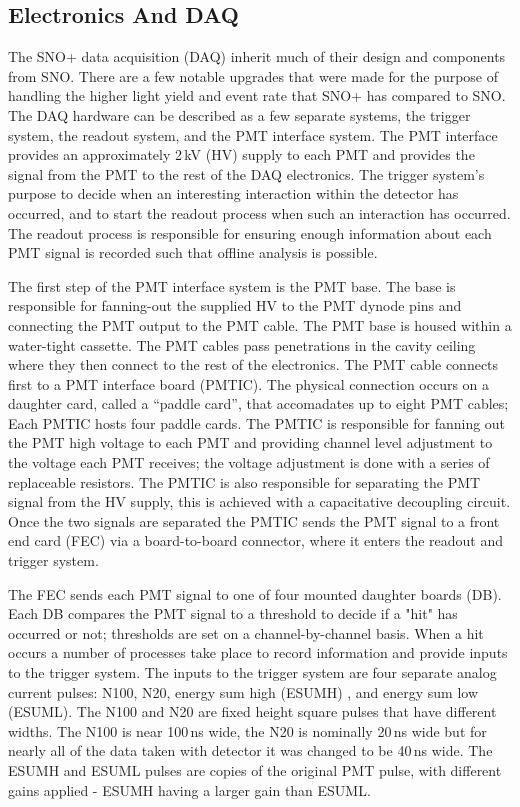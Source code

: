 \subsection{Electronics And DAQ}
The SNO+ data acquisition (DAQ) inherit much of their design and components from
SNO.
There are a few notable upgrades that were made for the purpose of handling the
higher light yield and event rate that SNO+ has compared to SNO.
The DAQ hardware can be described as a few separate systems, the trigger system,
the readout system, and the PMT interface system.
The PMT interface provides an approximately 2\,kV (HV) supply to each PMT and provides
the signal from the PMT to the rest of the DAQ electronics.
The trigger system's purpose to decide when an interesting interaction
within the detector has occurred, and to start the readout process when such an
interaction has occurred.
The readout process is responsible for ensuring enough information about each
PMT signal is recorded such that offline analysis is possible.

The first step of the PMT interface system is the PMT base. The base is responsible
for fanning-out the supplied HV to the PMT dynode pins and connecting the PMT output
to the PMT cable. The PMT base is housed within a water-tight cassette.
The PMT cables pass penetrations in the cavity ceiling where they then connect
to the rest of the electronics. The PMT cable connects first to a PMT interface
board (PMTIC). The physical connection occurs on a daughter card, called a ``paddle card'',
that accomadates up to eight PMT cables; Each PMTIC hosts four paddle cards.
The PMTIC is responsible for fanning out the PMT high voltage
to each PMT and providing channel level adjustment to the voltage
each PMT receives; the voltage adjustment is done with a series of
replaceable resistors.
The PMTIC is also responsible for separating the PMT signal from the HV
supply, this is achieved with a capacitative decoupling circuit.
Once the two signals are separated the PMTIC sends the PMT signal to
a front end card (FEC) via a board-to-board connector, where it enters
the readout and trigger system.

The FEC sends each PMT signal to one of four mounted daughter boards
(DB). Each DB compares the PMT signal to a threshold to decide if a "hit" has
occurred or not; thresholds are set on a channel-by-channel basis.
When a hit occurs a number of processes take place to record information and
provide inputs to the trigger system.
The inputs to the trigger system are four separate analog current pulses:
N100, N20, energy sum high (ESUMH) , and energy sum low (ESUML).
The N100 and N20 are fixed height square pulses that have different widths.
The N100 is near 100\,ns wide, the N20 is nominally 20\,ns wide but for nearly
all of the data taken with detector it was changed to be 40\,ns wide.
The ESUMH and ESUML pulses are copies of the original PMT pulse, with different
gains applied - ESUMH having a larger gain than ESUML.

